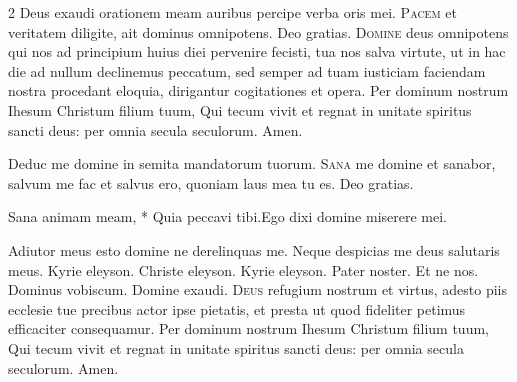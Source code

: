 \begin{multicols}{2}
\vspace{+1em}
\newline {}
\newline {}
\newline {} Deus exaudi orationem meam auribus percipe verba oris mei.
\newline {}
\lettrine[lines=2]{\zallmancaps \color{Red} P}{acem} et veritatem diligite, ait dominus omnipotens. \R Deo gratias. 
\lettrine[lines=2]{\zallmancaps \color{Blue} D}{omine} deus omnipotens qui nos ad principium huius diei pervenire fecisti, tua nos salva virtute, ut in hac die ad nullum declinemus peccatum, sed semper ad tuam iusticiam faciendam nostra procedant eloquia, dirigantur cogitationes et opera. Per dominum nostrum Ihesum Christum filium tuum, Qui tecum vivit et regnat in unitate spiritus sancti deus: per omnia secula seculorum. \R Amen.



\vspace{+1em}
\newline {}
\newline {}
\newline {} Deduc me domine in semita mandatorum tuorum.
\newline {}
\lettrine[lines=2]{\zallmancaps \color{Blue} S}{ana} me domine et sanabor, salvum me fac et salvus ero, quoniam laus mea tu es. \R Deo gratias.
\begin{responsory-breve}
{Sana animam meam, * Quia peccavi tibi.}{Ego dixi domine miserere mei.}
\end{responsory-breve}%
\newline \V Adiutor meus esto domine ne derelinquas me. \R Neque despicias me deus salutaris meus.
\newline {} Kyrie eleyson. Christe eleyson. Kyrie eleyson. Pater noster. Et ne nos.
\newline Dominus vobiscum.  Domine exaudi. 
\lettrine[lines=2]{\zallmancaps \color{Red} D}{eus} refugium nostrum et virtus, adesto piis ecclesie tue precibus actor ipse pietatis, et presta ut quod fideliter petimus efficaciter consequamur. Per dominum nostrum Ihesum Christum filium tuum, Qui tecum vivit et regnat in unitate spiritus sancti deus: per omnia secula seculorum. \R Amen.




\end{multicols}
